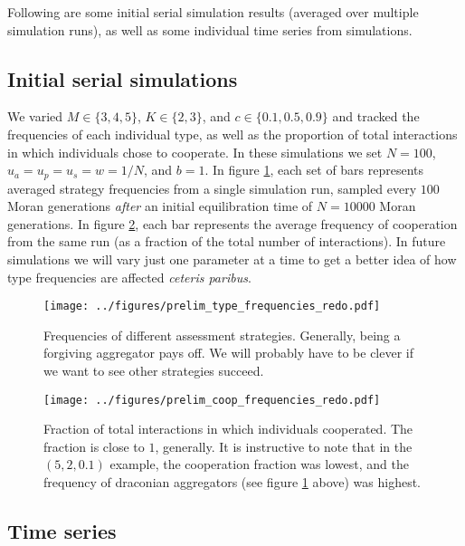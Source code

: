 \documentclass[13pt]{amsart}
\begin{document}
Following are some initial serial simulation results (averaged over multiple simulation runs), as well as some individual time series from simulations.

\clearpage

\subsection*{Initial serial simulations}

We varied $M \in \{3, 4, 5\}$, $K \in \{2, 3\}$, and $c \in \{0.1, 0.5, 0.9\}$ and tracked the frequencies of each individual type, as well as the proportion of total interactions in which individuals chose to cooperate.
In these simulations we set $N = 100$, $u_a = u_p = u_s = w = 1/N$, and $b = 1$.
In figure \ref{fig:prelim_type_freq}, each set of bars represents averaged strategy frequencies from a single simulation run, sampled every $100$ Moran generations \emph{after} an initial equilibration time of $N = 10000$ Moran generations.
In figure \ref{fig:prelim_coop_freq}, each bar represents the average frequency of cooperation from the same run (as a fraction of the total number of interactions).
In future simulations we will vary just one parameter at a time to get a better idea of how type frequencies are affected \emph{ceteris paribus}.

\clearpage

\begin{figure}[h]
    \texttt{[image: ../figures/prelim\_type\_frequencies\_redo.pdf]}
    \caption{Frequencies of different assessment strategies.
    Generally, being a forgiving aggregator pays off.
    We will probably have to be clever if we want to see other strategies succeed.}
    \label{fig:prelim_type_freq}
\end{figure}
\begin{figure}[h]
    \texttt{[image: ../figures/prelim\_coop\_frequencies\_redo.pdf]}
    \caption{Fraction of total interactions in which individuals cooperated.
    The fraction is close to $1$, generally.
    It is instructive to note that in the $(5,2,0.1)$ example, the cooperation fraction was lowest, and the frequency of draconian aggregators (see figure \ref{fig:prelim_type_freq} above) was highest.}
    \label{fig:prelim_coop_freq}
\end{figure}

\clearpage

\subsection*{Time series}
\end{document}
